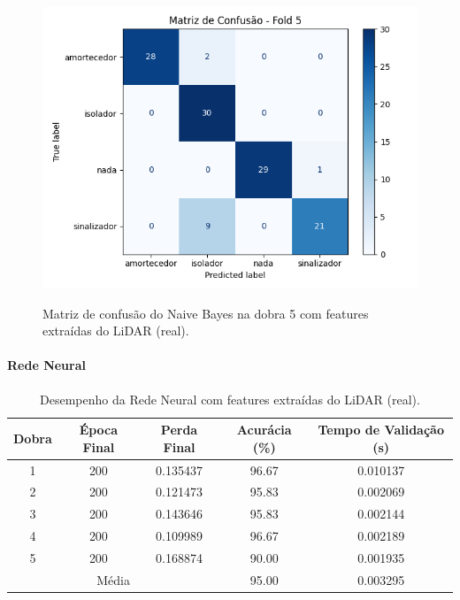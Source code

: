 \begin{figure}[H]
\caption{Matriz de confusão do Naive Bayes na dobra 5 com features extraídas do LiDAR (real).}
\centering
\includegraphics[width=0.7\linewidth]{figuras/Resultados/real_principal_Teste4_naive.png}
\fonte{}
\label{fig:matriz_confusao_naive_imagens_real}
\end{figure}

\paragraph{Rede Neural}

\begin{table}[H]
\caption{Desempenho da Rede Neural com features extraídas do LiDAR (real).}
\centering
\begin{tabular}{ccccc}
\hline
\textbf{Dobra} & \textbf{Época Final} & \textbf{Perda Final} & \textbf{Acurácia (\%)} & \textbf{Tempo de Validação (s)}  \\
\hline
1 & 200 & 0.135437 & 96.67 & 0.010137 \\
2 & 200 & 0.121473 & 95.83 & 0.002069 \\
3 & 200 & 0.143646 & 95.83 & 0.002144 \\
4 & 200 & 0.109989 & 96.67 & 0.002189 \\
5 & 200 & 0.168874 & 90.00 & 0.001935 \\
\hline
\multicolumn{3}{c}{Média} & 95.00 & 0.003295 \\
\hline
\end{tabular}
\fonte{}
\label{tab:resultados_nn_imagens_real}
\end{table}


